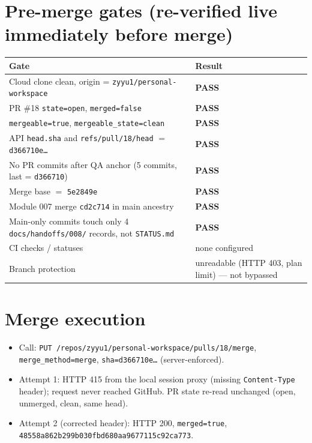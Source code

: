 \documentclass[11pt,a4paper]{article}
\newcommand{\sha}[1]{\texttt{\small #1}}
\newcommand{\PASS}{\textcolor{green!50!black}{\textbf{PASS}}}
\begin{document}
\section{Pre-merge gates (re-verified live immediately before merge)}
\begin{tabularx}{\textwidth}{@{}Xl@{}}
\toprule
Gate & Result \\
\midrule
Cloud clone clean, origin = \texttt{zyyu1/personal-workspace} & \PASS \\
PR \#18 \texttt{state=open}, \texttt{merged=false} & \PASS \\
\texttt{mergeable=true}, \texttt{mergeable\_state=clean} & \PASS \\
API \texttt{head.sha} and \texttt{refs/pull/18/head} $=$ \sha{d366710e\ldots} & \PASS \\
No PR commits after QA anchor (5 commits, last = \sha{d366710}) & \PASS \\
Merge base $=$ \sha{5e2849e} & \PASS \\
Module 007 merge \sha{cd2c714} in main ancestry & \PASS \\
Main-only commits touch only 4 \texttt{docs/handoffs/008/} records, not \texttt{STATUS.md} & \PASS \\
CI checks / statuses & none configured \\
Branch protection & unreadable (HTTP 403, plan limit) --- not bypassed \\
\bottomrule
\end{tabularx}

\section{Merge execution}
\begin{itemize}[nosep]
  \item Call: \texttt{PUT /repos/zyyu1/personal-workspace/pulls/18/merge}, \texttt{merge\_method=merge}, \texttt{sha=d366710e\ldots} (server-enforced).
  \item Attempt 1: HTTP 415 from the local session proxy (missing \texttt{Content-Type} header); request never reached GitHub. PR state re-read unchanged (open, unmerged, clean, same head).
  \item Attempt 2 (corrected header): HTTP 200, \texttt{merged=true}, \sha{48558a862b299b030fbd680aa9677115c92ca773}.
\end{itemize}
\end{document}
